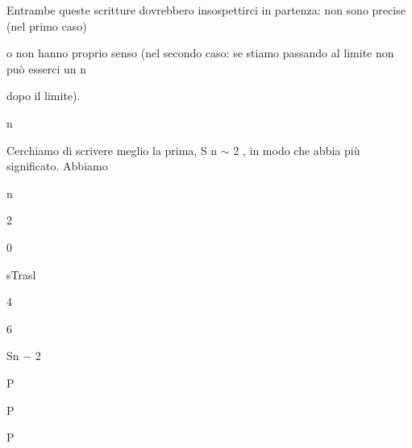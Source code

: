 \documentclass[a4paper,portrait,12pt]{article}
\begin{document}
\begin{flushleft}
Entrambe queste scritture dovrebbero insospettirci in partenza: non sono precise (nel primo caso)
\end{flushleft}


\begin{flushleft}
o non hanno proprio senso (nel secondo caso: se stiamo passando al limite non pu\`{o} esserci un n
\end{flushleft}


\begin{flushleft}
dopo il limite).
\end{flushleft}


\begin{flushleft}
n
\end{flushleft}


\begin{flushleft}
Cerchiamo di scrivere meglio la prima, S n $\sim$ 2 , in modo che abbia più significato. Abbiamo
\end{flushleft}


\begin{flushleft}
n
\end{flushleft}





2


0





\begin{flushleft}
sTrasl
\end{flushleft}





4





6





\begin{flushleft}
Sn $-$ 2
\end{flushleft}


\begin{flushleft}
P
\end{flushleft}


\begin{flushleft}
P
\end{flushleft}


\begin{flushleft}
P
\end{flushleft}
\end{document}

